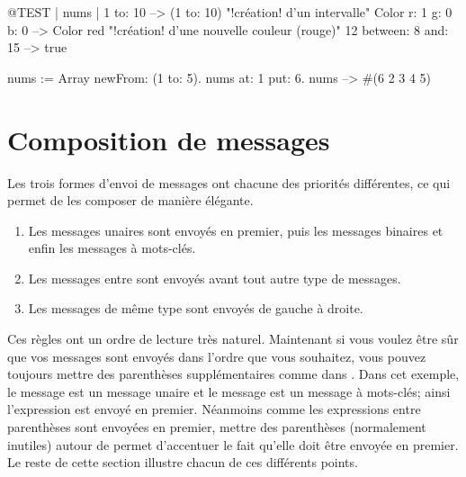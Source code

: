 \documentclass[a4paper,10pt,twoside]{book}
\begin{document}

\begin{code}{@TEST | nums |}
1 to: 10                        --> (1 to: 10)  "!cr\'eation! d'un intervalle"
Color r: 1 g: 0 b: 0       --> Color red  "!cr\'eation! d'une nouvelle
couleur (rouge)"
12 between: 8 and: 15 --> true

nums := Array newFrom: (1 to: 5).
nums at: 1 put: 6.
nums --> #(6 2 3 4 5)
\end{code}


\section{Composition de messages}
Les trois formes d'envoi de messages ont chacune des priorit\'es diff\'erentes, ce qui permet de les composer de mani\`ere \'el\'egante.

\begin{enumerate}
\item Les messages unaires sont envoy\'es en premier, puis les messages binaires et enfin les messages \`a mots-cl\'es.
\item Les messages entre  sont envoy\'es avant tout autre type de messages. 
\item Les messages de m\^eme type sont envoy\'es de gauche \`a droite. 
\end{enumerate}

Ces r\`egles ont un ordre de lecture tr\`es naturel. Maintenant si
vous voulez \^etre s\^ur que vos messages sont envoy\'es dans l'ordre
que vous souhaitez, vous pouvez toujours mettre des parenth\`eses
suppl\'ementaires comme dans . Dans cet exemple, le
message  est un message unaire et le message 
est un message \`a mots-cl\'es; ainsi l'expression 
est envoy\'e en premier. N\'eanmoins comme les expressions entre
parenth\`eses sont envoy\'ees en premier, mettre des parenth\`eses
(normalement inutiles) autour de  permet d'accentuer
le fait qu'elle
doit \^etre envoy\'ee en premier. Le reste de cette section illustre
chacun de ces diff\'erents points.
\end{document}
